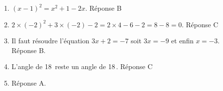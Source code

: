 
\medskip

%
%
%
%
\begin{enumerate}
\item $(x - 1)^2 = x^2 + 1 - 2x$. Réponse B
\item $2\times (- 2)^2 + 3 \times (- 2) - 2 = 2 \times 4  - 6 - 2 = 8 - 8 = 0$. Réponse C
\item Il faut résoudre l'équation $3x + 2 = - 7$ soit $3x = - 9$ et enfin $x = - 3$. Réponse B.
\item L'angle de 18\,\degres{} reste un angle de 18\,\degres{}. Réponse C
\item Réponse A.
\end{enumerate}

\vspace{0.5cm}

